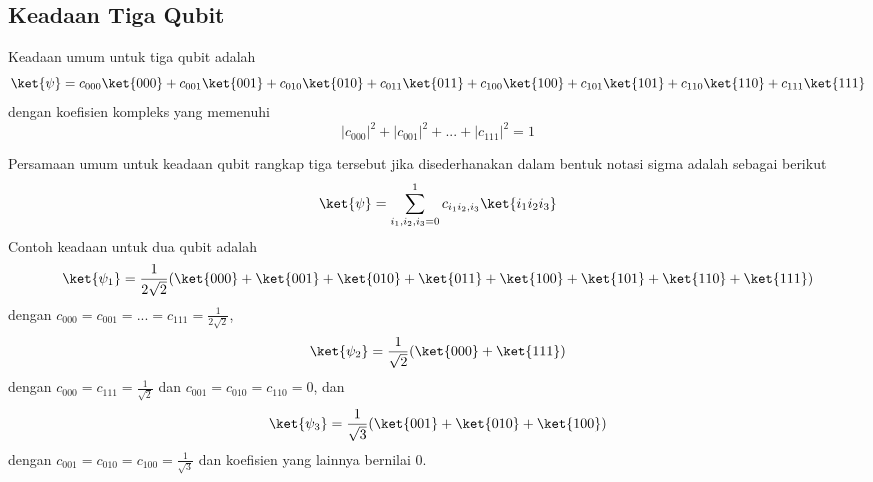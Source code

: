 \subsection{Keadaan Tiga Qubit}
Keadaan umum untuk tiga qubit adalah
\begin{equation}
	\ket{\psi}=c_{000}\ket{000}+c_{001}\ket{001}+c_{010}\ket{010}+c_{011}\ket{011}+c_{100}\ket{100}+c_{101}\ket{101}+c_{110}\ket{110}+c_{111}\ket{111}
\end{equation}
dengan koefisien kompleks yang memenuhi
\begin{equation}
	|c_{000}|^2+|c_{001}|^2+...+|c_{111}|^2=1
\end{equation}
\par
Persamaan umum untuk keadaan qubit rangkap tiga tersebut jika disederhanakan dalam bentuk notasi sigma adalah sebagai berikut
\begin{equation}
	\ket{\psi}=\sum_{i_1,i_2,i_3=0}^{1} c_{i_1 i_2,i_3} \ket{i_1 i_2 i_3 }\label{umum3qubit}
\end{equation}
Contoh keadaan untuk dua qubit adalah
\begin{equation}
	\ket{\psi_1}=\frac{1}{2\sqrt{2}}(\ket{000}+\ket{001}+\ket{010}+\ket{011}+\ket{100}+\ket{101}+\ket{110}+\ket{111})
\end{equation}
dengan $c_{000}=c_{001}=...=c_{111}=\frac{1}{2\sqrt{2}}$,
\begin{equation}
	\ket{\psi_2}=\frac{1}{\sqrt{2}}(\ket{000}+\ket{111})
\end{equation}
dengan $c_{000}=c_{111}=\frac{1}{\sqrt{2}}$ dan $c_{001}=c_{010}=c_{110}=0$, dan
\begin{equation}
	\ket{\psi_3}=\frac{1}{\sqrt{3}}(\ket{001}+\ket{010}+\ket{100})
\end{equation}
dengan $c_{001}=c_{010}=c_{100}=\frac{1}{\sqrt{3}}$ dan koefisien yang lainnya bernilai 0.

